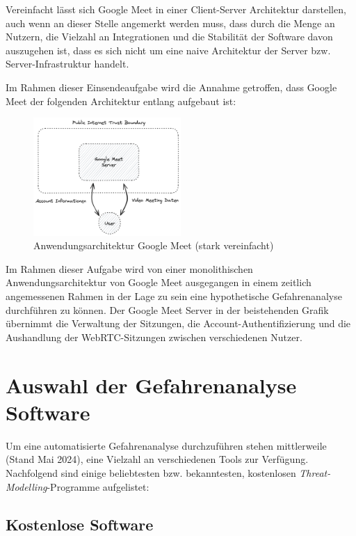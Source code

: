 \documentclass{article}
\begin{document}
Vereinfacht lässt sich Google Meet in einer Client-Server Architektur darstellen, auch 
wenn an dieser Stelle angemerkt werden muss, dass durch die Menge an Nutzern, die Vielzahl 
an Integrationen und die Stabilität der Software davon auszugehen ist, dass es sich nicht 
um eine naive Architektur der Server bzw. Server-Infrastruktur handelt. 

Im Rahmen dieser Einsendeaufgabe wird die Annahme getroffen, dass Google Meet der 
folgenden Architektur entlang aufgebaut ist:

\begin{figure}[H]
	\includegraphics[width=0.5\textwidth]{./google-meet-diagram.png}
	\centering
	\caption{Anwendungsarchitektur Google Meet (stark vereinfacht)}
\end{figure}

Im Rahmen dieser Aufgabe wird von einer monolithischen Anwendungsarchitektur von Google 
Meet ausgegangen in einem zeitlich angemessenen Rahmen in der Lage zu sein eine 
hypothetische Gefahrenanalyse durchführen zu können. Der Google Meet Server in der 
beistehenden Grafik übernimmt die Verwaltung der Sitzungen, die Account-Authentifizierung 
und die Aushandlung der WebRTC-Sitzungen zwischen verschiedenen Nutzer.

\section{Auswahl der Gefahrenanalyse Software}

Um eine automatisierte Gefahrenanalyse durchzuführen stehen mittlerweile (Stand Mai 2024), 
eine Vielzahl an verschiedenen Tools zur Verfügung. Nachfolgend sind einige beliebtesten 
bzw. bekanntesten, kostenlosen \textit{Threat-Modelling}-Programme aufgelistet:


\subsection*{Kostenlose Software}
\end{document}
